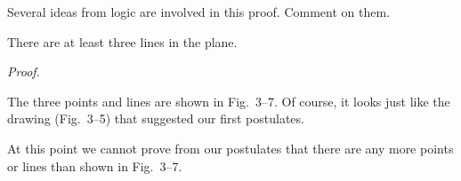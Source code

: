 \documentclass[11pt]{book}
\theoremstyle{bkplain}
\theoremstyle{XIplainnote}
\theoremstyle{bkplain}
\theoremstyle{bkplain}
\begin{document}
\begin{remark}
Several ideas from logic are involved in this proof. Comment on them.
\end{remark}

\begin{theorem}
There are at least three lines in the plane.
\end{theorem}

\FIGIIISIXSEVEN

\noindent\emph{Proof.}
\begin{steps}
\end{steps}

The three points and lines are shown in Fig.~3--7. Of course, it looks just like
the drawing (Fig.~3--5) that suggested our first postulates.

\begin{remark}
At this point we cannot prove from our postulates that there are any more points
or lines than shown in Fig.~3--7.
\end{remark}
\end{document}
